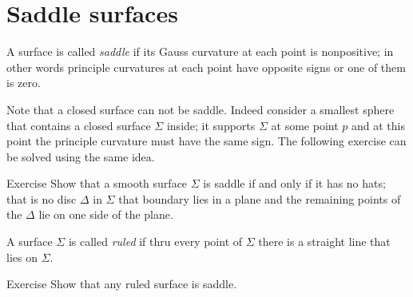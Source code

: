 \chapter{Saddle surfaces}

A surface is called \emph{saddle} if its Gauss curvature at each point is nonpositive;
in other words principle curvatures at each point have opposite signs or one of them is zero.

Note that a closed surface can not be saddle.
Indeed consider a smallest sphere that contains a closed surface $\Sigma$ inside;
it supports $\Sigma$ at some point $p$ and at this point the principle curvature must have the same sign.
The following exercise can be solved using the same idea.

\begin{thm}{Exercise}
Show that a smooth surface $\Sigma$ is saddle if and only if it has no hats;
that is no disc $\Delta$ in $\Sigma$ that boundary lies in a plane and the remaining points of the $\Delta$ lie on one side of the plane.  
\end{thm}

A surface $\Sigma$ is called \emph{ruled} if thru every point of $\Sigma$ there is a straight line that lies on $\Sigma$.

\begin{thm}{Exercise}
Show that any ruled surface is saddle.
\end{thm}

